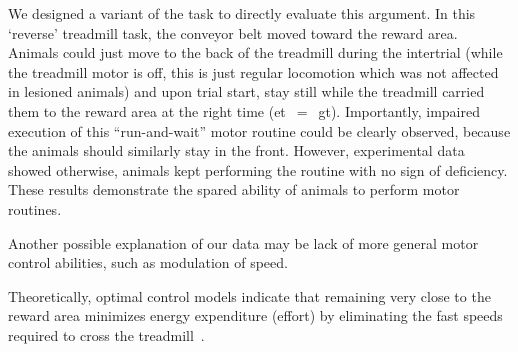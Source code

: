 We designed a variant of the task to directly evaluate this argument.
In this `reverse' treadmill task, the conveyor belt moved toward the reward area.
Animals could just move to the back of the treadmill during the intertrial (while the treadmill motor is off, this is just regular locomotion which was not affected in lesioned animals) and upon trial start, stay still while the treadmill carried them to the reward area at the right time (\gls{et}~$=$~\gls{gt}).
Importantly, impaired execution of this ``run-and-wait'' motor routine could be clearly observed, because the animals should similarly stay in the front.
However, experimental data showed otherwise, animals kept performing the routine with no sign of deficiency.
These results demonstrate the spared ability of animals to perform motor routines.
\par
Another possible explanation of our data may be lack of more general motor control abilities, such as modulation of speed.





Theoretically, optimal control models indicate that remaining very close to the reward area minimizes energy expenditure (effort) by eliminating the fast speeds required to cross the treadmill~\cite{JuradoParras2020}.


